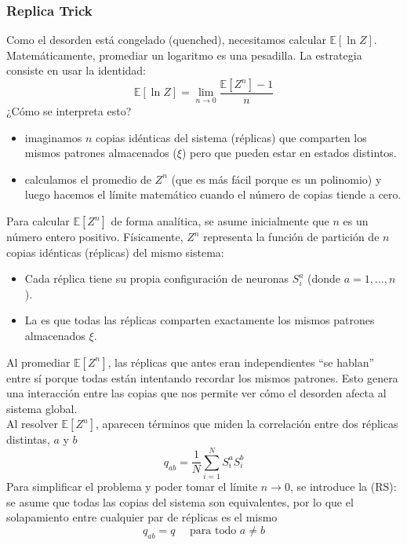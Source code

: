 \subsubsection{Replica Trick}
\noindent
Como el desorden está congelado (quenched), necesitamos calcular $\mathbb{E}[\ln Z]$. Matemáticamente, promediar un logaritmo es una pesadilla. La estrategia consiste en usar la identidad:
\begin{equation*}
    \mathbb{E}[\ln Z] = \lim_{n \to 0} \dfrac{\mathbb{E}[Z^n] - 1}{n}
\end{equation*}
¿Cómo se interpreta esto?
\begin{itemize}
    \item {} imaginamos $n$ copias idénticas del sistema (réplicas) que comparten los mismos patrones almacenados ($\xi$) pero que pueden estar en estados distintos.
    \item {} calculamos el promedio de $Z^n$ (que es más fácil porque es un polinomio) y luego hacemos el límite matemático cuando el número de copias tiende a cero.
\end{itemize}
\noindent
Para calcular $\mathbb{E}[Z^n]$ de forma analítica, se asume inicialmente que $n$ es un número entero positivo. Físicamente, $Z^n$ representa la función de partición de $n$ copias idénticas (réplicas) del mismo sistema:
\begin{itemize}
    \item Cada réplica tiene su propia configuración de neuronas $S_i^a$ (donde $a=1, \dots, n$).
    \item La  es que todas las réplicas comparten exactamente los mismos patrones almacenados $\xi$.
\end{itemize}
Al promediar $\mathbb{E}[Z^n]$, las réplicas que antes eran independientes ``se hablan'' entre sí porque todas están intentando recordar los mismos patrones. Esto genera una interacción entre las copias que nos permite ver cómo el desorden afecta al sistema global. \\

\noindent
Al resolver $\mathbb{E}[Z^n]$, aparecen términos que miden la correlación entre dos réplicas distintas, $a$ y $b$
\begin{equation*}
    q_{ab} = \frac{1}{N} \sum_{i=1}^N S_i^a S_i^b
\end{equation*}
Para simplificar el problema y poder tomar el límite $n \to 0$, se introduce la  (RS): se asume que todas las copias del sistema son equivalentes, por lo que el solapamiento entre cualquier par de réplicas es el mismo
\begin{equation*}
    q_{ab} = q \quad \text{ para todo } a \neq b
\end{equation*}
